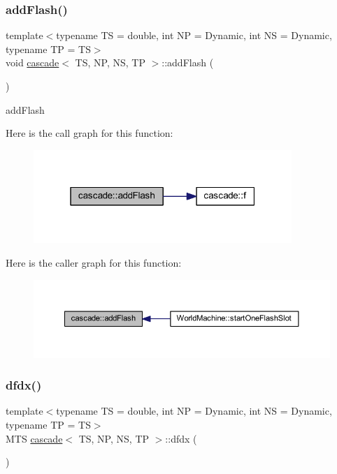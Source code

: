 \subsubsection{\texorpdfstring{add\+Flash()}{addFlash()}}
{\footnotesize\ttfamily template$<$typename TS = double, int NP = Dynamic, int NS = Dynamic, typename TP = TS$>$ \\
void \mbox{\hyperlink{classcascade}{cascade}}$<$ TS, NP, NS, TP $>$\+::add\+Flash (\begin{DoxyParamCaption}{ }\end{DoxyParamCaption})\hspace{0.3cm}{\ttfamily [inline]}}



add\+Flash 

Here is the call graph for this function\+:\nopagebreak
\begin{figure}[H]
\begin{center}
\leavevmode
\includegraphics[width=277pt]{classcascade_ae1aae44e18b9d87cb710c54726726baa_cgraph}
\end{center}
\end{figure}
Here is the caller graph for this function\+:\nopagebreak
\begin{figure}[H]
\begin{center}
\leavevmode
\includegraphics[width=350pt]{classcascade_ae1aae44e18b9d87cb710c54726726baa_icgraph}
\end{center}
\end{figure}
\mbox{\label{classcascade_ac72705f0ad01cc88d43c002d63acce13}} 
\subsubsection{\texorpdfstring{dfdx()}{dfdx()}}
{\footnotesize\ttfamily template$<$typename TS = double, int NP = Dynamic, int NS = Dynamic, typename TP = TS$>$ \\
M\+TS \mbox{\hyperlink{classcascade}{cascade}}$<$ TS, NP, NS, TP $>$\+::dfdx (\begin{DoxyParamCaption}{ }\end{DoxyParamCaption})\hspace{0.3cm}{\ttfamily [inline]}}



